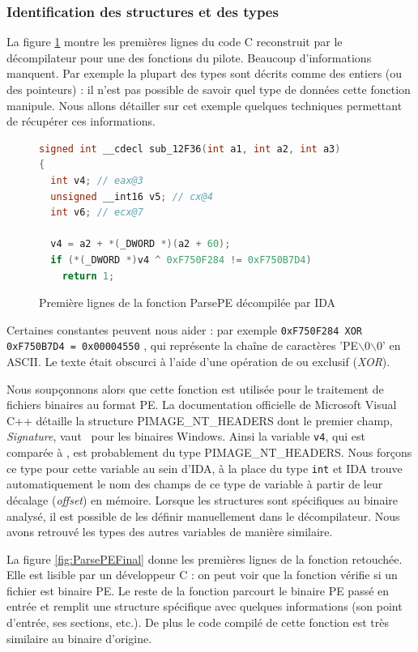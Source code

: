 \subsubsection{Identification des structures et des types}
La figure \ref{fig:ParsePEInitial} montre les premières lignes du code C reconstruit par le décompilateur pour une des fonctions du pilote.
Beaucoup d'informations manquent. Par exemple la plupart des types sont décrits comme des entiers (ou des pointeurs) : il n'est pas possible de savoir quel type de données cette fonction manipule.
Nous allons détailler sur cet exemple quelques techniques permettant de récupérer ces informations.

\begin{figure}[h]
\begin{lstlisting}[language={C}]
signed int __cdecl sub_12F36(int a1, int a2, int a3)
{
  int v4; // eax@3
  unsigned __int16 v5; // cx@4
  int v6; // ecx@7

  v4 = a2 + *(_DWORD *)(a2 + 60);
  if (*(_DWORD *)v4 ^ 0xF750F284 != 0xF750B7D4)
    return 1;
\end{lstlisting}
\caption{Première lignes de la fonction ParsePE décompilée par IDA\label{fig:ParsePEInitial}}
\end{figure}

Certaines constantes peuvent nous aider : par exemple \texttt{0xF750F284 XOR 0xF750B7D4 = 0x00004550} , qui représente la chaîne de caractères 'PE$\backslash$0$\backslash$0' en ASCII. Le texte était obscurci à l'aide d'une opération de ou exclusif (\emph{XOR}).

Nous soupçonnons alors que cette fonction est utilisée pour le traitement de fichiers binaires au format PE.
La documentation officielle de Microsoft Visual C++ détaille la structure PIMAGE\_NT\_HEADERS dont le premier champ, \emph{Signature}, vaut \PEzz\ pour les binaires Windows.
Ainsi la variable \texttt{v4}, qui est comparée à \PEzz, est probablement du type PIMAGE\_NT\_HEADERS.
Nous forçons ce type pour cette variable au sein d'IDA, à la place du type \texttt{int} et IDA trouve automatiquement le nom des champs de ce type de variable à partir de leur décalage (\emph{offset}) en mémoire.
Lorsque les structures sont spécifiques au binaire analysé, il est possible de les définir manuellement dans le décompilateur.
Nous avons retrouvé les types des autres variables de manière similaire.

La figure \ref{fig:ParsePEFinal} donne les premières lignes de la fonction retouchée.
Elle est lisible par un développeur C : on peut voir que la fonction vérifie si un fichier est binaire PE.
Le reste de la fonction parcourt le binaire PE passé en entrée et remplit une structure spécifique avec quelques informations (son point d'entrée, ses sections, etc.).
De plus le code compilé de cette fonction est très similaire au binaire d'origine.


